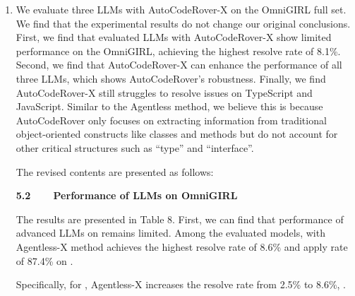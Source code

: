 \documentclass[12pt,american]{article}
\begin{document}
\begin{revresponse}
\begin{enumerate}
\item We evaluate three LLMs with AutoCodeRover-X on the OmniGIRL full set. We find that the experimental results do not change our original conclusions. First, we find that evaluated LLMs with AutoCodeRover-X show limited performance on the OmniGIRL, achieving the highest resolve rate of 8.1\%. Second, we find that AutoCodeRover-X can enhance the performance of all three LLMs, which shows AutoCodeRover's robustness. Finally, we find AutoCodeRover-X still struggles to resolve issues on TypeScript and JavaScript. Similar to the Agentless method, we believe this is because AutoCodeRover only focuses on extracting information from traditional
object-oriented constructs like classes and methods but do not account for other critical structures such as ``type'' and ``interface''.

The revised contents are presented as follows:

\begin{changes}
\textbf{5.2~~~~Performance of LLMs on OmniGIRL}

  The results are presented in Table 8. First, we can find that  performance of advanced LLMs on \Swebenchx remains limited. Among the evaluated models, \GPT with Agentless-X method achieves the highest resolve rate of 8.6\% and apply rate of 87.4\% on \Swebenchx. 

 Specifically, for \GPT, Agentless-X increases the resolve rate from 2.5\% to 8.6\%, . 
 


\end{changes}
\end{enumerate}
\end{revresponse}
\end{document}
